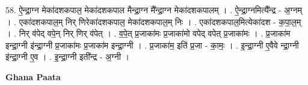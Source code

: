 \documentclass[17pt]{extarticle}
\begin{document}
58. ऐ॒न्द्रा॒ग्न मेका॑दशकपाल॒ मेका॑दशकपाल मैन्द्रा॒ग्न मै᳚न्द्रा॒ग्न मेका॑दशकपालम् । . ऐ॒न्द्रा॒ग्नमित्यै᳚न्द्र - अ॒ग्नम् । . एका॑दशकपाल॒म् निर् णिरेका॑दशकपाल॒ मेका॑दशकपाल॒म् निः । . एका॑दशकपाल॒मित्येका॑दश - क॒पा॒ल॒म् । . निर् व॑पेद् वपे॒न् निर् णिर् व॑पेत् । . व॒पे॒त् प्र॒जाका॑मः प्र॒जाका॑मो वपेद् वपेत् प्र॒जाका॑मः । . प्र॒जाका॑म इन्द्रा॒ग्नी इ॑न्द्रा॒ग्नी प्र॒जाका॑मः प्र॒जाका॑म इन्द्रा॒ग्नी । . प्र॒जाका॑म॒ इति॑ प्र॒जा - का॒मः॒ । . इ॒न्द्रा॒ग्नी ए॒वैवे न्द्रा॒ग्नी इ॑न्द्रा॒ग्नी ए॒व । . इ॒न्द्रा॒ग्नी इती᳚न्द्र - अ॒ग्नी । \newline

\textbf{Ghana Paata } \newline
\end{document}

